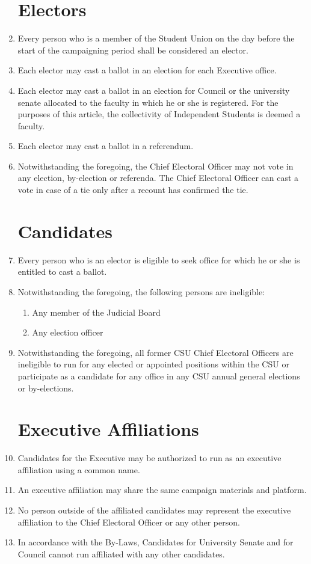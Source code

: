 \documentclass[oneside]{book}
\begin{document}
\begin{enumerate}
\section{\label{Electors}Electors }
\item Every person who is a member of the Student Union on the day before
the start of the campaigning period shall be considered an elector. 
\item Each elector may cast a ballot in an election for each Executive office. 
\item Each elector may cast a ballot in an election for Council or the university
senate allocated to the faculty in which he or she is registered.
For the purposes of this article, the collectivity of Independent
Students is deemed a faculty. 
\item Each elector may cast a ballot in a referendum. 
\item Notwithstanding the foregoing, the Chief Electoral Officer may not
vote in any election, by-election or referenda. The Chief Electoral
Officer can cast a vote in case of a tie only after a recount has
confirmed the tie. 

\section{\label{Candidates}Candidates }
\item \label{enu:eligibility-for-office}Every person who is an elector
is eligible to seek office for which he or she is entitled to cast
a ballot. 
\item Notwithstanding the foregoing, the following persons are ineligible: 

\begin{enumerate}
\item Any member of the Judicial Board 
\item Any election officer 
\end{enumerate}
\item Notwithstanding the foregoing, all former CSU Chief Electoral Officers
are ineligible to run for any elected or appointed positions within
the CSU or participate as a candidate for any office in any CSU annual
general elections or by-elections. 

\section{\label{Executive Affiliations}Executive Affiliations}
\item Candidates for the Executive may be authorized to run as an executive
affiliation using a common name. 
\item An executive affiliation may share the same campaign materials and
platform. 
\item No person outside of the affiliated candidates may represent the executive
affiliation to the Chief Electoral Officer or any other person. 
\item In accordance with the By-Laws, Candidates for University Senate and
for Council cannot run affiliated with any other candidates. 


\end{enumerate}
\end{document}
